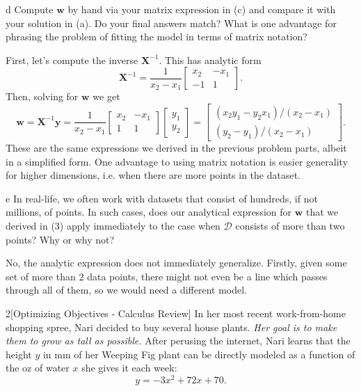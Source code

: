 \documentclass[expanded]{lkx_pset}
\begin{document}
\begin{parts}
  \begin{part}{d}
    Compute $\mathbf{w}$ by hand via your matrix expression in (c) and compare it with your solution in (a). Do your final answers match? What is one advantage for phrasing the problem of fitting the model in terms of matrix notation? 
  \end{part}

  First, let's compute the inverse $\mathbf{X}^{-1}$. This has analytic form
  \[
    \mathbf{X}^{-1} = \frac{1}{x_2 - x_1}\begin{bmatrix}x_2 & -x_1\\ -1 & 1\end{bmatrix}.
  \]
  Then, solving for $\mathbf{w}$ we get
  \[
    \mathbf{w} = \mathbf{X}^{-1}\mathbf{y} = \frac{1}{x_2 - x_1}\begin{bmatrix}x_2 & -x_1\\ 1 & 1\end{bmatrix}\begin{bmatrix}y_1\\ y_2\end{bmatrix} = \begin{bmatrix} (x_2 y_1 - y_2 x_1)/(x_2-x_1)\\ (y_2 - y_1)/(x_2 - x_1)\end{bmatrix}.
  \]
  These are the same expressions we derived in the previous problem parts, albeit in a simplified form. One advantage to using matrix notation is easier generality for higher dimensions, i.e. when there are more points in the dataset.

  \begin{part}{e}
    In real-life, we often work with datasets that consist of hundreds, if not millions, of points. In such cases, does our analytical expression for $\mathbf{w}$ that we derived in (3) apply immediately to the case when $\mathcal{D}$ consists of more than two points? Why or why not?
  \end{part}

  No, the analytic expression does not immediately generalize. Firstly, given some set of more than $2$ data points, there might not even be a line which passes through all of them, so we would need a different model.
\end{parts}

\begin{problem}{2}[Optimizing Objectives - Calculus Review]
   In her most recent work-from-home shopping spree, Nari decided to buy several house plants. \textit{Her goal is to make them to grow as tall as possible.} After perusing the internet, Nari learns that the height $y$ in mm of her Weeping Fig plant can be directly modeled as a function of the oz of water $x$ she gives it each week:
$$y = - 3x^2 + 72x + 70.$$
\end{problem}
\end{document}
